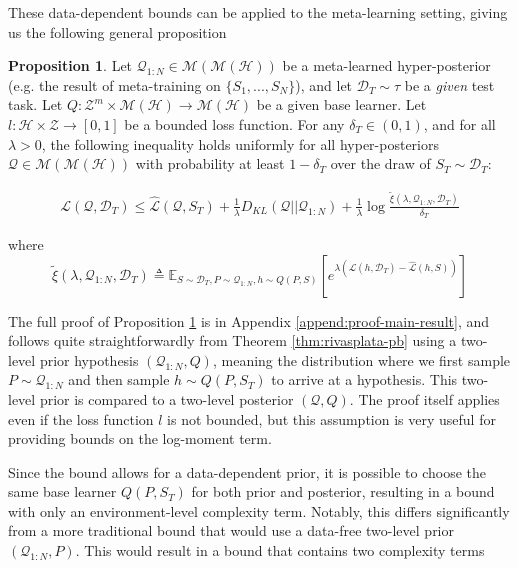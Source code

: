 \documentclass{article}
\theoremstyle{definition}
\newtheorem{proposition}[theorem]{Proposition}
\newcommand{\Expect}[2]{\mathbb{E}_{#1}\left [#2 \right ]}
\begin{document}
These data-dependent bounds can be applied to the meta-learning setting, giving us the following general proposition

\begin{proposition} \label{thm:main-result}
	Let $\mathcal{Q}_{1:N}\in \mathcal{M}(\mathcal{M}(\mathcal{H}))$ be a meta-learned hyper-posterior (e.g. the result of meta-training on $\{S_1,...,S_N\}$), and let $\mathcal{D}_T\sim \tau$ be a \emph{given} test task. Let $Q: \mathcal{Z}^m\times\mathcal{M}(\mathcal{H})\rightarrow \mathcal{M}(\mathcal{H})$ be a given base learner. Let $l: \mathcal{H}\times \mathcal{Z}\rightarrow [0, 1]$ be a bounded loss function.
	For any $\delta_T \in (0,1)$, and for all $\lambda>0$, the following inequality holds uniformly for all hyper-posteriors $\mathcal{Q}\in \mathcal{M}(\mathcal{M}(\mathcal{H}))$ with probability at least $1-\delta_T$ over the draw of $S_T\sim \mathcal{D}_T$:
	
	\begin{align} \label{eq:main-result-generic}
	\mathcal{L}(\mathcal{Q}, \mathcal{D}_T) \leq \hat{\mathcal{L}}(\mathcal{Q}, S_T) + \frac{1}{\lambda}D_{KL}(\mathcal{Q}||\mathcal{Q}_{1:N})
	+\frac{1}{\lambda}\log\frac{\tilde{\xi}(\lambda,\mathcal{Q}_{1:N},\mathcal{D}_T)}{\delta_T}
	\end{align}
	
	
	where 
	$$\tilde{\xi}(\lambda,\mathcal{Q}_{1:N},\mathcal{D}_T)\triangleq \Expect{S\sim \mathcal{D}_T, P\sim \mathcal{Q}_{1:N}, h\sim Q(P,S)}{e^{\lambda\left (\mathcal{L}(h, \mathcal{D}_T)-\hat{\mathcal{L}}(h, S)\right )}}$$
\end{proposition}

The full proof of Proposition \ref{thm:main-result} is in Appendix \ref{append:proof-main-result}, and follows quite straightforwardly from Theorem \ref{thm:rivasplata-pb} using a two-level prior hypothesis $(\mathcal{Q}_{1:N}, Q)$, meaning the distribution where we first sample $P\sim \mathcal{Q}_{1:N}$ and then sample $h\sim Q(P, S_T)$ to arrive at a hypothesis. This two-level prior is compared to a two-level posterior $(\mathcal{Q}, Q)$. The proof itself applies even if the loss function $l$ is not bounded, but this assumption is very useful for providing bounds on the log-moment term.

Since the bound allows for a data-dependent prior, it is possible to choose the same base learner $Q(P, S_T)$ for both prior and posterior, resulting in a bound with only an environment-level complexity term. 
Notably, this differs significantly from a more traditional bound that would use a data-free two-level prior $(\mathcal{Q}_{1:N}, P)$. This would result in a bound that contains two complexity terms
\end{document}
